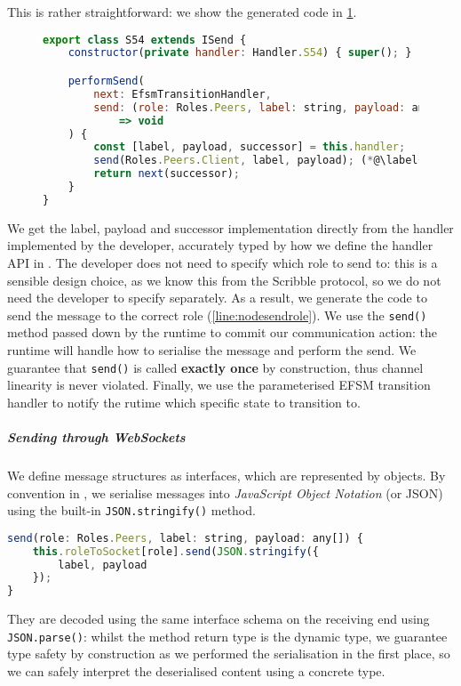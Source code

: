 This is rather straightforward: 
we show the generated code in \cref{lst:nodesend}.

\begin{figure}[!h]
\begin{lstlisting}[language=javascript,tabsize=2]
export class S54 extends ISend {
	constructor(private handler: Handler.S54) { super(); }

	performSend(
		next: EfsmTransitionHandler,
		send: (role: Roles.Peers, label: string, payload: any[]) 
			=> void
	) {
		const [label, payload, successor] = this.handler;
		send(Roles.Peers.Client, label, payload); (*@\label{line:nodesendrole}@*)
		return next(successor);
	}
}
\end{lstlisting}
\label{lst:nodesend}
\end{figure}

We get the label, payload and successor implementation
directly from the handler implemented by the developer, 
accurately typed by how we define the handler API in .
The developer does not need to specify which role
to send to: this is a sensible design choice, as we know this
from the Scribble protocol, so we do not need the developer 
to specify separately.
As a result, we generate the code to send the message
to the correct role (\cref{line:nodesendrole}).
We use the \texttt{send()} method passed down
by the runtime to commit our communication action:
the runtime will handle how to serialise the message and perform
the send. We guarantee that \texttt{send()} is called
\textbf{exactly once} by construction, thus channel linearity
is never violated.
Finally, we use the parameterised EFSM transition handler
to notify the rutime which specific state to transition to.

\subparagraph{Sending through WebSockets}
We define message structures as interfaces, which
are represented by objects. 
By convention in ,
we serialise messages into \textit{JavaScript Object Notation}
(or JSON) \cite{json} using the built-in \texttt{JSON.stringify()}
method.

\begin{lstlisting}[language=javascript]
send(role: Roles.Peers, label: string, payload: any[]) {
	this.roleToSocket[role].send(JSON.stringify({
		label, payload
	});
}
\end{lstlisting}

They are decoded using the same interface schema on the receiving end
using \texttt{JSON.parse()}: whilst the method return type is the
dynamic  type, 
we guarantee type safety by construction
as we performed the serialisation in the first place, so
we can safely interpret the deserialised content 
using a concrete type.

